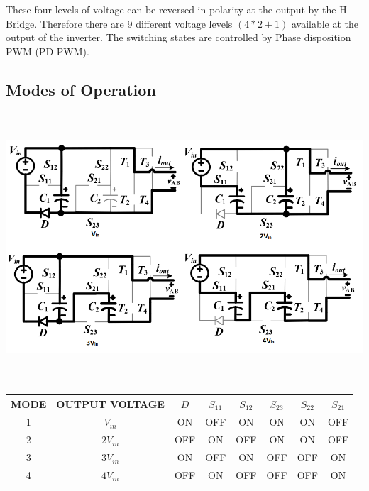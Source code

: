 \documentclass[12pt,a4paper]{report}
\begin{document}
These four levels of voltage can be reversed in polarity at the output by the H-Bridge. Therefore there are 9 different voltage levels $(4*2 + 1)$ available at the output of the inverter. The switching states are controlled by Phase disposition PWM (PD-PWM).

\clearpage

\subsection*{Modes of Operation}

\begin{center}
	\includegraphics[width=16.5cm,height=10cm]{figures/Mode}
\end{center}

\begin{center}
	\begin{tabular}{|c|c|c|c|c|c|c|c|} 
		\hline
		{\bf MODE} & {\bf OUTPUT VOLTAGE} & {\bf $D$} & {\bf $S_{11}$} & {\bf $S_{12}$} & {\bf $S_{23}$} & {\bf $S_{22}$} & {\bf $S_{21}$} \\  
		\hline
		1 & $V_{in}$  & ON  & OFF & ON  & ON  & ON  & OFF \\ 
		\hline
		2 & $2V_{in}$ & OFF & ON  & OFF & ON  & ON  & OFF \\
		\hline
		3 & $3V_{in}$ & ON  & OFF & ON  & OFF & OFF & ON \\
		\hline
		4 & $4V_{in}$ & OFF & ON  & OFF & OFF & OFF & ON \\
		\hline
	\end{tabular}
\end{center}
\end{document}
